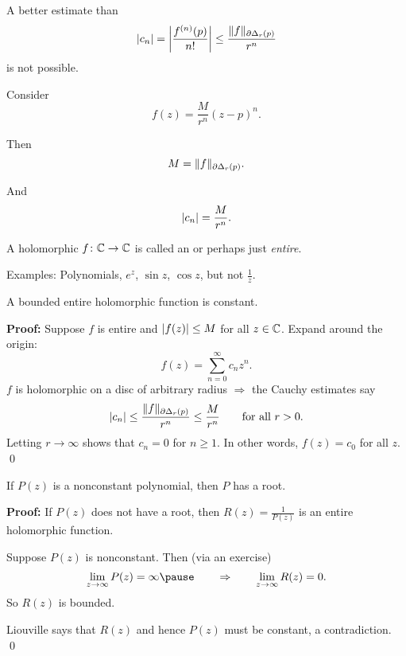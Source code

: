 \documentclass[10pt,aspectratio=169]{beamer}
\begin{document}
\begin{frame}

A better estimate than
\[
\lvert {c_n} \rvert =
\left\lvert {\frac{f^{(n)}(p)}{n!}} \right\rvert
\leq
\frac{\lVert {f} \rVert_{\partial \Delta_r(p)}}{r^{n}}
\]
is not possible.

\medskip
\pause

Consider \[
f(z) = \frac{M}{r^n} {(z-p)}^n .
\]

\medskip
\pause

Then
\[
M = \lVert {f} \rVert_{\partial \Delta_r(p)} .
\]

\medskip
\pause

And
\[
\lvert {c_n} \rvert = \frac{M}{r^n} .
\]

\end{frame}

\begin{frame}

\begin{definition}
A holomorphic $f \colon {\mathbb{C}} \to {\mathbb{C}}$ is called
an \emph{} or perhaps
just \emph{entire}.
\end{definition}

\pause

Examples: Polynomials, $e^z$, $\sin z$, $\cos z$, but not $\frac{1}{z}$.

\pause

\begin{theorem}[Liouville]
A bounded entire holomorphic function is constant.
\end{theorem}

\pause

\textbf{Proof:}
Suppose $f$ is entire and $\lvert {f(z)} \rvert \leq M$ for all $z \in {\mathbb{C}}$.
\pause
Expand around the origin:
\[
f(z) = \sum_{n=0}^\infty c_n z^n .
\]
\pause
$f$ is holomorphic on a disc of arbitrary radius
\pause \qquad $\Rightarrow$ \qquad
the Cauchy estimates say
\[
\lvert {c_n} \rvert \leq \frac{\lVert {f} \rVert_{\partial \Delta_r(p)}}{r^n} \leq
\frac{M}{r^n}
\qquad \text{for all } r > 0 .
\]
\pause
Letting $r \to \infty$ shows that $c_n = 0$ for $n \geq 1$.
\pause
In other
words, $f(z) = c_0$ for all $z$.
\qed

\end{frame}

\begin{frame}
\begin{theorem}
If $P(z)$ is a nonconstant polynomial, then $P$ has a root.
\end{theorem}

\pause

\textbf{Proof:}
If $P(z)$ does not have a root, then $R(z) = \frac{1}{P(z)}$ is
an entire holomorphic function.

\medskip
\pause

Suppose $P(z)$ is nonconstant.  Then (via an exercise)
\[
\lim_{z \to \infty} P(z) = \infty
\pause
\qquad \Rightarrow \qquad
\lim_{z \to \infty} R(z) = 0.
\]
\pause
So $R(z)$ is bounded.

\medskip
\pause

Liouville says that $R(z)$ and hence $P(z)$ must be constant, a
contradiction.
\qed
\end{frame}
\end{document}
